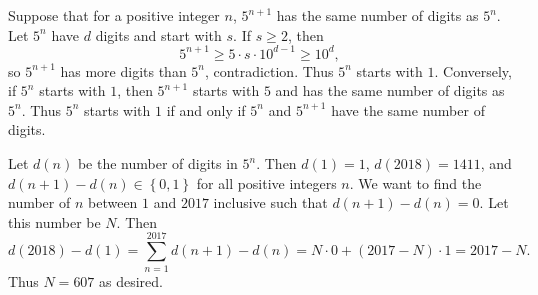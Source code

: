 Suppose that for a positive integer $n$, $5^{n+1}$ has the same number of digits as $5^n$. Let $5^n$ have $d$ digits and start with $s$. If $s\geq2$, then \[5^{n+1}\geq5\cdot s\cdot10^{d-1}\geq10^d,\] so $5^{n+1}$ has more digits than $5^n$, contradiction. Thus $5^n$ starts with $1$. Conversely, if $5^n$ starts with $1$, then $5^{n+1}$ starts with $5$ and has the same number of digits as $5^n$. Thus $5^n$ starts with $1$ if and only if $5^n$ and $5^{n+1}$ have the same number of digits.

Let $d\left(n\right)$ be the number of digits in $5^n$. Then $d\left(1\right)=1$, $d\left(2018\right)=1411$, and $d\left(n+1\right)-d\left(n\right)\in\left\{0,1\right\}$ for all positive integers $n$. We want to find the number of $n$ between $1$ and $2017$ inclusive such that $d\left(n+1\right)-d\left(n\right)=0$. Let this number be $N$. Then \[d\left(2018\right)-d\left(1\right)=\displaystyle\sum_{n=1}^{2017}d\left(n+1\right)-d\left(n\right)=N\cdot0+\left(2017-N\right)\cdot1=2017-N.\] Thus $N=\boxed{607}$ as desired.
